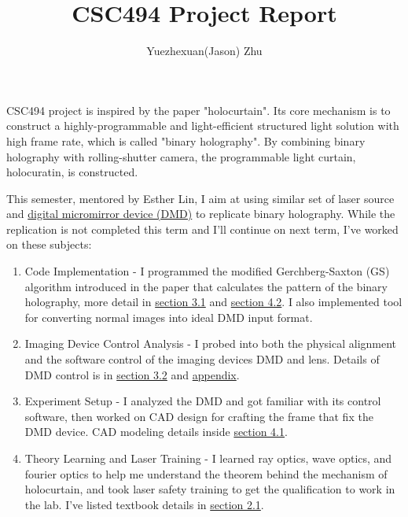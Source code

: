 \documentclass[10pt,journal,compsoc]{IEEEtran}
\title{CSC494 Project Report}
\author{Yuezhexuan(Jason) Zhu}
\newif\ifpeerreview
\newcommand{\paperID}{XXXX}
\begin{document}
\ifpeerreview
\linenumbers \linenumbersep 15pt\relax 
\author{Paper ID \paperID\IEEEcompsocitemizethanks{\IEEEcompsocthanksitem This paper is under review for ICCP 2020 and the PAMI special issue on computational photography. Do not distribute.}}
\markboth{Anonymous ICCP 2020 submission ID \paperID}%
{}
\fi
\maketitle


 CSC494 project is inspired by the paper "holocurtain"\cite{holocurtain}. Its core mechanism is to construct a highly-programmable and light-efficient structured light solution with high frame rate, which is called "binary holography". By combining binary holography with rolling-shutter camera, the programmable light curtain, holocuratin, is constructed.

This semester, mentored by Esther Lin, I aim at using similar set of laser source and \hyperref[sec:2.1]{digital micromirror device (DMD)} to replicate binary holography. While the replication is not completed this term and I'll continue on next term, I've worked on these subjects:
\begin{enumerate}
    \item Code Implementation - I programmed the modified Gerchberg-Saxton (GS) algorithm introduced in the paper\cite{holocurtain} that calculates the pattern of the binary holography, more detail in \hyperref[sec:3.1]{section 3.1} and \hyperref[sec:4.2]{section 4.2}. I also implemented tool for converting normal images into ideal DMD input format.
    \item Imaging Device Control Analysis - I probed into both the physical alignment and the software control of the imaging devices DMD and lens. Details of DMD control is in \hyperref[sec:3.2]{section 3.2} and \hyperref[sec:user_guide]{appendix}.
    \item Experiment Setup - I analyzed the DMD and got familiar with its control software, then worked on CAD design for crafting the frame that fix the DMD device. CAD modeling details inside \hyperref[sec:4.1]{section 4.1}.
    \item Theory Learning and Laser Training - I learned ray optics, wave optics, and fourier optics to help me understand the theorem behind the mechanism of holocurtain, and took laser safety training to get the qualification to work in the lab. I've listed textbook details in \hyperref[sec:2.1]{section 2.1}.
\end{enumerate}
\end{document}
